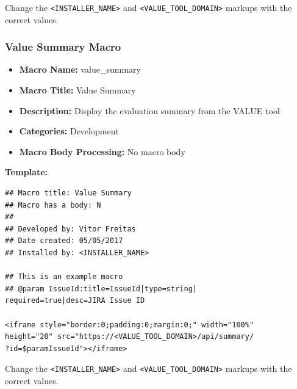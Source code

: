 \documentclass{article}
\begin{document}
Change the \texttt{\textless INSTALLER\_NAME\textgreater} and \texttt{\textless VALUE\_TOOL\_DOMAIN\textgreater} markups with the correct values.

\subsubsection{Value Summary Macro}

\begin{itemize}
    \item \textbf{Macro Name:} value\_summary
    \item \textbf{Macro Title:} Value Summary
    \item \textbf{Description:} Display the evaluation summary from the VALUE tool
    \item \textbf{Categories:} Development
    \item \textbf{Macro Body Processing:} No macro body
\end{itemize}

\textbf{Template:}

\begin{lstlisting}[frame=single]
## Macro title: Value Summary
## Macro has a body: N
##
## Developed by: Vitor Freitas
## Date created: 05/05/2017
## Installed by: <INSTALLER_NAME>

## This is an example macro
## @param IssueId:title=IssueId|type=string|
required=true|desc=JIRA Issue ID

<iframe style="border:0;padding:0;margin:0;" width="100%" 
height="20" src="https://<VALUE_TOOL_DOMAIN>/api/summary/
?id=$paramIssueId"></iframe>

\end{lstlisting}

Change the \texttt{\textless INSTALLER\_NAME\textgreater} and \texttt{\textless VALUE\_TOOL\_DOMAIN\textgreater} markups with the correct values.
\end{document}

